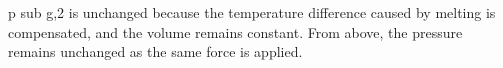 p sub g,2 is unchanged because the temperature difference caused by melting is compensated, and the volume remains constant. From above, the pressure remains unchanged as the same force is applied.